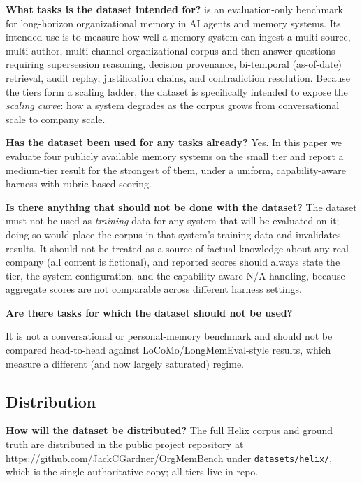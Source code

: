 \textbf{What tasks is the dataset intended for?}
\bench{} is an evaluation-only benchmark for long-horizon organizational memory
in AI agents and memory systems. Its intended use is to measure how well a memory
system can ingest a multi-source, multi-author, multi-channel organizational
corpus and then answer questions requiring supersession reasoning, decision
provenance, bi-temporal (as-of-date) retrieval, audit replay, justification
chains, and contradiction resolution. Because the tiers form a scaling ladder,
the dataset is specifically intended to expose the \emph{scaling curve}: how a
system degrades as the corpus grows from conversational scale to company scale.

\textbf{Has the dataset been used for any tasks already?}
Yes. In this paper we evaluate four publicly available memory systems on the
small tier and report a medium-tier result for the strongest of them, under a
uniform, capability-aware harness with rubric-based scoring.

\textbf{Is there anything that should not be done with the dataset?}
The dataset must not be used as \emph{training} data for any system that will be
evaluated on it; doing so would place the corpus in that system's training data
and invalidates results. It should not be treated as a source of factual
knowledge about any real company (all content is fictional), and reported scores
should always state the tier, the system configuration, and the capability-aware
N/A handling, because aggregate scores are not comparable across different
harness settings.

\textbf{Are there tasks for which the dataset should not be used?}
{\sloppy
It is not a conversational or personal-memory benchmark and should not be
compared head-to-head against LoCoMo/LongMemEval-style results, which measure a
different (and now largely saturated) regime.\par}

\subsection{Distribution}

\textbf{How will the dataset be distributed?}
The full Helix corpus and ground truth are distributed in the public project
repository at \url{https://github.com/JackCGardner/OrgMemBench} under
\texttt{datasets/helix/}, which is the single authoritative copy; all tiers live
in-repo.


